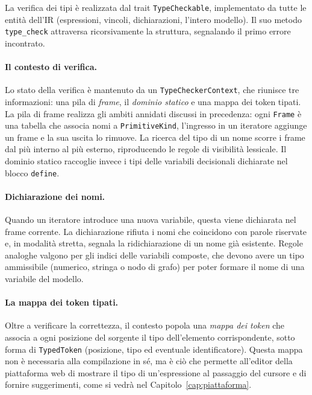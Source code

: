 La verifica dei tipi è realizzata dal trait \texttt{TypeCheckable}, implementato
da tutte le entità dell'IR (espressioni, vincoli, dichiarazioni, l'intero
modello). Il suo metodo \texttt{type\_check} attraversa ricorsivamente la
struttura, segnalando il primo errore incontrato.

\paragraph{Il contesto di verifica.}
Lo stato della verifica è mantenuto da un \texttt{TypeCheckerContext}, che
riunisce tre informazioni: una pila di \emph{frame}, il \emph{dominio statico}
e una mappa dei token tipati. La pila di frame realizza gli ambiti annidati
discussi in precedenza: ogni \texttt{Frame} è una tabella che associa nomi a
\texttt{PrimitiveKind}, l'ingresso in un iteratore aggiunge un frame e la sua
uscita lo rimuove. La ricerca del tipo di un nome scorre i frame dal più interno
al più esterno, riproducendo le regole di visibilità lessicale. Il dominio
statico raccoglie invece i tipi delle variabili decisionali dichiarate nel
blocco \texttt{define}.

\paragraph{Dichiarazione dei nomi.}
Quando un iteratore introduce una nuova variabile, questa viene dichiarata nel
frame corrente. La dichiarazione rifiuta i nomi che coincidono con parole
riservate e, in modalità stretta, segnala la ridichiarazione di un nome già
esistente. Regole
analoghe valgono per gli indici delle variabili composte, che devono avere un
tipo ammissibile (numerico, stringa o nodo di grafo) per poter formare il nome di
una variabile del modello.

\paragraph{La mappa dei token tipati.}
Oltre a verificare la correttezza, il contesto popola una \emph{mappa dei token}
che associa a ogni posizione del sorgente il tipo dell'elemento corrispondente,
sotto forma di \texttt{TypedToken} (posizione, tipo ed eventuale identificatore).
Questa mappa non è necessaria alla compilazione in sé, ma è ciò che permette
all'editor della piattaforma web di mostrare il tipo di un'espressione al
passaggio del cursore e di fornire suggerimenti, come si vedrà nel
Capitolo~\ref{cap:piattaforma}.

